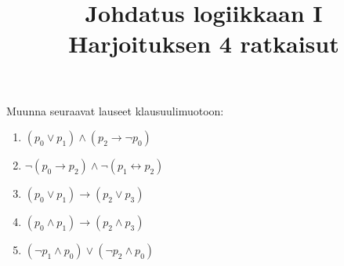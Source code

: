 \documentclass[11pt,a4paper]{amsart}
\title{Johdatus logiikkaan I\\Harjoituksen 4 ratkaisut}
\author{}
\date{}
\begin{document}

\begin{exercise}
  Muunna seuraavat lauseet klausuulimuotoon:
\begin{enumerate}[label=\alph*), nosep]
  \item \((p_0 \lor p_1) \land (p_2 \rightarrow \neg p_0)\)
  \item \(\neg(p_0 \rightarrow p_2) \land \neg(p_1 \leftrightarrow p_2)\)
  \item \((p_0 \lor p_1) \rightarrow (p_2 \lor p_3)\)
  \item \((p_0 \land p_1) \rightarrow (p_2 \land p_3)\)
  \item \((\neg p_1 \land p_0) \lor (\neg p_2 \land p_0)\)
\end{enumerate}
\end{exercise}
\end{document}

